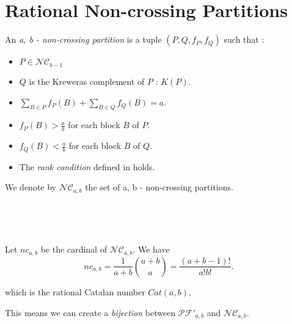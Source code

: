 \section{Rational Non-crossing Partitions}

\begin{definition}
    An \emph{a, b - non-crossing partition} is a tuple
    $(P, Q, f_P, f_Q)$ such that :
    \begin{itemize}
        \item $P \in \mathcal{NC}_{b - 1}$
        \item $Q$ is the Kreweras complement of $P$ : $K(P)$.
        \item $\displaystyle \sum_{B \in P}{f_P(B)} + 
                \sum_{B \in Q}{f_Q(B)} = a$.
        \item $f_P(B) > \frac{a}{b}$ for each block $B$
                of $P$.
        \item $f_Q(B) < \frac{a}{b}$ for each block $B$
                of $Q$.
        \item The \emph{rank condition} defined in
                \cite{ref8} holds.
    \end{itemize}
\end{definition}

We denote by $\mathcal{NC}_{a,b}$ the set of 
a, b - non-crossing partitions.

\begin{example}[$a > b : a = 7, b = 3$]
    ~\\
    \begin{center}
        
    \end{center}
\end{example}

\begin{example}[$a < b : a = 3, b = 5$]
    ~\\
    \begin{center}
        
    \end{center}
\end{example}

\begin{theorem}[Bodnar, 2017]
    Let $nc_{a,b}$ be the cardinal of $\mathcal{NC}_{a,b}$.
    We have $$nc_{a,b} = \frac{1}{a+b} \binom{a+b}{a} = 
    \frac{(a+b-1)!}{a!b!}.$$
\end{theorem}

which is the rational Catalan number $Cat(a,b)$.

\begin{prop}
    This means we can create a \emph{bijection} between
    $\mathcal{PF'}_{a,b}$ and $\mathcal{NC}_{a,b}$.
\end{prop}

